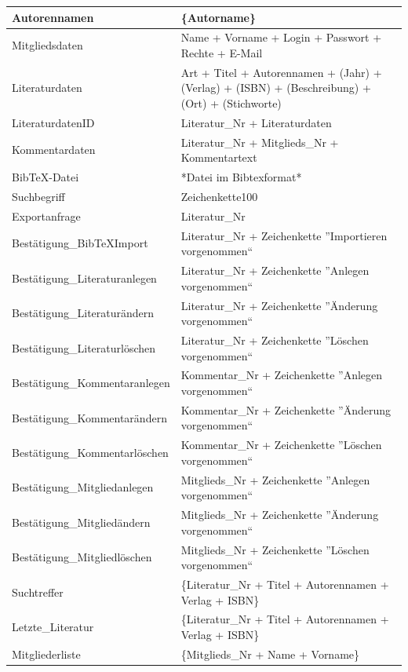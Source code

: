 \begin{longtable}{|l|p{8.5cm}|}
Autorennamen & \{Autorname\} \\
\hline
Mitgliedsdaten & Name + Vorname + Login + Passwort + Rechte + E-Mail\\
\hline
Literaturdaten & Art + Titel + Autorennamen + (Jahr) + (Verlag) + (ISBN) + (Beschreibung) + (Ort) + (Stichworte) \\
LiteraturdatenID & Literatur\_Nr + Literaturdaten \\
\hline
Kommentardaten & Literatur\_Nr + Mitglieds\_Nr + Kommentartext \\
\hline
BibTeX-Datei & *Datei im Bibtexformat* \\
\hline
Suchbegriff & Zeichenkette100 \\
\hline
Exportanfrage & Literatur\_Nr \\
\hline\hline

Bestätigung\_BibTeXImport & Literatur\_Nr + Zeichenkette ''Importieren vorgenommen`` \\
\hline
Bestätigung\_Literaturanlegen & Literatur\_Nr + Zeichenkette ''Anlegen vorgenommen`` \\
\hline
Bestätigung\_Literaturändern & Literatur\_Nr + Zeichenkette ''Änderung vorgenommen`` \\
\hline
Bestätigung\_Literaturlöschen & Literatur\_Nr + Zeichenkette ''Löschen vorgenommen`` \\
\hline
Bestätigung\_Kommentaranlegen & Kommentar\_Nr + Zeichenkette ''Anlegen vorgenommen`` \\
\hline
Bestätigung\_Kommentarändern & Kommentar\_Nr + Zeichenkette ''Änderung vorgenommen`` \\
\hline
Bestätigung\_Kommentarlöschen & Kommentar\_Nr + Zeichenkette ''Löschen vorgenommen`` \\
\hline
Bestätigung\_Mitgliedanlegen & Mitglieds\_Nr + Zeichenkette ''Anlegen vorgenommen`` \\
\hline
Bestätigung\_Mitgliedändern & Mitglieds\_Nr + Zeichenkette ''Änderung vorgenommen`` \\
\hline
Bestätigung\_Mitgliedlöschen & Mitglieds\_Nr + Zeichenkette ''Löschen vorgenommen`` \\
\hline
Suchtreffer & \{Literatur\_Nr + Titel + Autorennamen + Verlag + ISBN\}\\
\hline
Letzte\_Literatur & \{Literatur\_Nr + Titel + Autorennamen + Verlag + ISBN\}\\
\hline
Mitgliederliste & \{Mitglieds\_Nr + Name + Vorname\}\\
\hline
\end{longtable}


